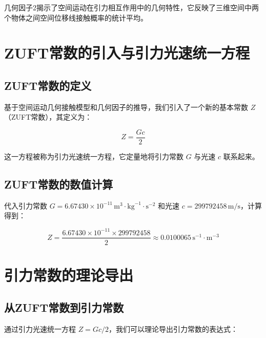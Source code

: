 \documentclass[12pt,a4paper]{article}
\begin{document}
几何因子2揭示了空间运动在引力相互作用中的几何特性，它反映了三维空间中两个物体之间空间位移线接触概率的统计平均。

\section{ZUFT常数的引入与引力光速统一方程}
\label{section:zhang_constant_introduction}

\subsection{ZUFT常数的定义}
\label{subsection:zhang_constant_definition}

基于空间运动几何接触模型和几何因子的推导，我们引入了一个新的基本常数 $Z$（ZUFT常数），其定义为：

\begin{equation}
Z = \frac{G c}{2}

\end{equation}

这一方程被称为引力光速统一方程，它定量地将引力常数 $G$ 与光速 $c$ 联系起来。

\subsection{ZUFT常数的数值计算}
\label{subsection:zhang_constant_numerical}

代入引力常数 $G = 6.67430 \times 10^{-11} \, \text{m}^3 \cdot \text{kg}^{-1} \cdot \text{s}^{-2}$ 和光速 $c = 299792458 \, \text{m/s}$，计算得到：

\begin{equation}
Z = \frac{6.67430 \times 10^{-11} \times 299792458}{2} \approx 0.0100065 \, \text{s}^{-1} \cdot \text{m}^{-3}

\end{equation}

\section{引力常数的理论导出}
\label{section:gravitational_constant_derivation}

\subsection{从ZUFT常数到引力常数}
\label{subsection:from_zhang_to_g}

通过引力光速统一方程 $Z = G c / 2$，我们可以理论导出引力常数的表达式：
\end{document}

